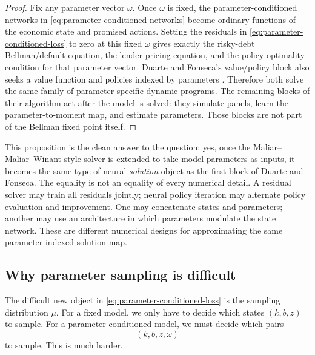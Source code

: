 \documentclass[11pt]{article}
\newcommand{\1}{\mathbf{1}}
\begin{document}
\begin{proof}
Fix any parameter vector \(\omega\). Once \(\omega\) is fixed, the
parameter-conditioned networks in \cref{eq:parameter-conditioned-networks}
become ordinary functions of the economic state and promised actions. Setting
the residuals in \cref{eq:parameter-conditioned-loss} to zero at this fixed
\(\omega\) gives exactly the risky-debt Bellman/default equation, the
lender-pricing equation, and the policy-optimality condition for that
parameter vector. Duarte and Fonseca's value/policy block also seeks a value
function and policies indexed by parameters
\citep[Section 3.1 and eq. (13)]{duartefonseca2026ai}. Therefore both solve
the same family of parameter-specific dynamic programs. The remaining blocks
of their algorithm act after the model is solved: they simulate panels, learn
the parameter-to-moment map, and estimate parameters. Those blocks are not
part of the Bellman fixed point itself.
\end{proof}

This proposition is the clean answer to the question: yes, once the
Maliar--Maliar--Winant style solver is extended to take model parameters as
inputs, it becomes the same type of neural \emph{solution} object as the first
block of Duarte and Fonseca. The equality is not an equality of every numerical
detail. A residual solver may train all residuals jointly; neural policy
iteration may alternate policy evaluation and improvement. One may concatenate
states and parameters; another may use an architecture in which parameters
modulate the state network. These are different numerical designs for
approximating the same parameter-indexed solution map.

\subsection{Why parameter sampling is difficult}

The difficult new object in \cref{eq:parameter-conditioned-loss} is the
sampling distribution \(\mu\). For a fixed model, we only have to decide which
states \((k,b,z)\) to sample. For a parameter-conditioned model, we must decide
which pairs
\[
  (k,b,z,\omega)
\]
to sample. This is much harder.
\end{document}
